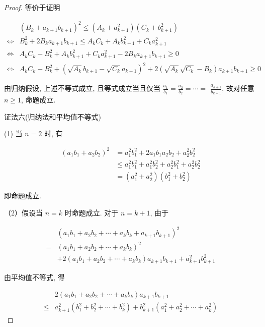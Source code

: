 \begin{proof}
	等价于证明
	
	$$
	\begin{aligned}
	& \left(B_{k}+a_{k+1} b_{k+1}\right)^{2} \leqslant\left(A_{k}+a_{k+1}^{2}\right)\left(C_{k}+b_{k+1}^{2}\right) \\
	\Leftrightarrow & B_{k}^{2}+2 B_{k} a_{k+1} b_{k+1} \leqslant A_{k} C_{k}+A_{k} b_{k+1}^{2}+C_{k} a_{k+1}^{2} \\
	\Leftrightarrow & A_{k} C_{k}-B_{k}^{2}+A_{k} b_{k+1}^{2}+C_{k} a_{k+1}^{2}-2 B_{k} a_{k+1} b_{k+1} \geqslant 0 \\
	\Leftrightarrow & A_{k} C_{k}-B_{k}^{2}+\left(\sqrt{A_{k}} b_{k+1}-\sqrt{C_{k}} a_{k+1}\right)^{2}+2\left(\sqrt{A_{k}} \sqrt{C_{k}}-B_{k}\right) a_{k+1} b_{k+1} \geqslant 0
	\end{aligned}
	$$
	
	由归纳假设, 上述不等式成立, 且等式成立当且仅当 $\frac{a_{1}}{b_{1}}=\frac{a_{2}}{b_{2}}=\cdots=$ $\frac{a_{k+1}}{b_{k+1}}$, 故对任意 $n \geqslant 1$, 命题成立.
	
	证法六(归纳法和平均值不等式)
	
	(1) 当 $n=2$ 时, 有
	
	$$
	\begin{aligned}
	\left(a_{1} b_{1}+a_{2} b_{2}\right)^{2} & =a_{1}^{2} b_{1}^{2}+2 a_{1} b_{1} a_{2} b_{2}+a_{2}^{2} b_{2}^{2} \\
	& \leqslant a_{1}^{2} b_{1}^{2}+a_{1}^{2} b_{2}^{2}+a_{2}^{2} b_{1}^{2}+a_{2}^{2} b_{2}^{2} \\
	& =\left(a_{1}^{2}+a_{2}^{2}\right)\left(b_{1}^{2}+b_{2}^{2}\right)
	\end{aligned}
	$$
	
	即命题成立.
	
	（2）假设当 $n=k$ 时命题成立. 对于 $n=k+1$, 由于
	
	$$
	\begin{aligned}
	& \left(a_{1} b_{1}+a_{2} b_{2}+\cdots+a_{k} b_{k}+a_{k+1} b_{k+1}\right)^{2} \\
	= & \left(a_{1} b_{1}+a_{2} b_{2}+\cdots+a_{k} b_{k}\right)^{2} \\
	& +2\left(a_{1} b_{1}+a_{2} b_{2}+\cdots+a_{k} b_{k}\right) a_{k+1} b_{k+1}+a_{k+1}^{2} b_{k+1}^{2}
	\end{aligned}
	$$
	
	由平均值不等式, 得
	
	$$
	\begin{aligned}
	& 2\left(a_{1} b_{1}+a_{2} b_{2}+\cdots+a_{k} b_{k}\right) a_{k+1} b_{k+1} \\
	\leqslant & a_{k+1}^{2}\left(b_{1}^{2}+b_{2}^{2}+\cdots+b_{k}^{2}\right)+b_{k+1}^{2}\left(a_{1}^{2}+a_{2}^{2}+\cdots+a_{k}^{2}\right)
	\end{aligned}
	$$
	

\end{proof}
